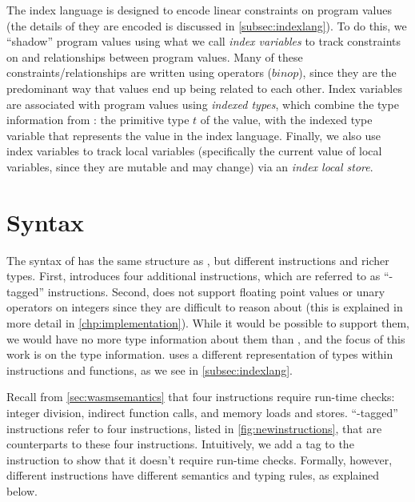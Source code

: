 The \name index language is designed to encode linear constraints on program values (the details of they are encoded is discussed in \autoref{subsec:indexlang}).
To do this, we ``shadow'' \name program values using what we call \emph{index variables} to track constraints on and relationships between program values.
Many of these constraints/relationships are written using \wasm operators (\eg $binop$), since they are the predominant way that \wasm values end up being related to each other.
Index variables are associated with program values using \emph{indexed types}, which combine the type information from \wasm: the primitive type $t$ of the value, with the indexed type variable that represents the value in the index language.
Finally, we also use index variables to track local variables (specifically the current value of local variables, since they are mutable and may change) via an \emph{index local store}.

\section{\name Syntax}
The syntax of \name has the same structure as \wasm, but different instructions and richer types.
First, \name introduces four additional instructions, which are referred to as ``\prechk-tagged'' instructions.
Second, \name does not support floating point values or unary operators on integers since they are difficult to reason about (this is explained in more detail in \autoref{chp:implementation}).
While it would be possible to support them, we would have no more type information about them than \wasm, and the focus of this work is on the type information.
\name uses a different representation of types within instructions and functions, as we see in \autoref{subsec:indexlang}.

Recall from \autoref{sec:wasmsemantics} that four \wasm instructions require run-time checks: integer division, indirect function calls, and memory loads and stores.
``\prechk-tagged'' instructions refer to four \name instructions, listed in \autoref{fig:newinstructions}, that are counterparts to these four \wasm instructions.
Intuitively, we add a tag to the instruction to show that it doesn't require run-time checks.
Formally, however, different instructions have different semantics and typing rules, as explained below.

